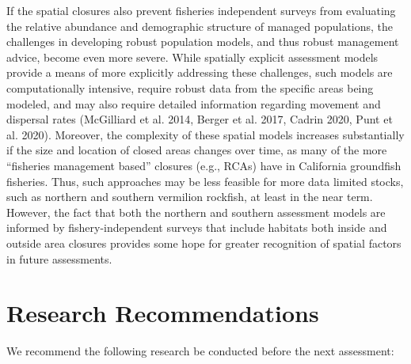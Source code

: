 \documentclass[
  english,
  a4paper,
]{article}
\begin{document}
If the spatial closures also prevent fisheries independent surveys from evaluating the relative abundance and demographic structure of managed populations, the challenges in developing robust population models, and thus robust management advice, become even more severe. While spatially explicit assessment models provide a means of more explicitly addressing these challenges, such models are computationally intensive, require robust data from the specific areas being modeled, and may also require detailed information regarding movement and dispersal rates (McGilliard et al. 2014, Berger et al. 2017, Cadrin 2020, Punt et al. 2020). Moreover, the complexity of these spatial models increases substantially if the size and location of closed areas changes over time, as many of the more ``fisheries management based'' closures (e.g., RCAs) have in California groundfish fisheries. Thus, such approaches may be less feasible for more data limited stocks, such as northern and southern vermilion rockfish, at least in the near term. However, the fact that both the northern and southern assessment models are informed by fishery-independent surveys that include habitats both inside and outside area closures provides some hope for greater recognition of spatial factors in future assessments.

\hypertarget{research-recommendations}{%
\section{Research Recommendations}\label{research-recommendations}}

We recommend the following research be conducted before the next assessment:
\end{document}
